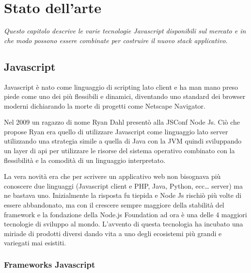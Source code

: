 \chapter{Stato dell'arte}
\label{cha:intro}
\vspace{5mm}
\emph{Questo capitolo descrive le varie tecnologie Javascript disponibili sul mercato e in che modo possono essere combinate per costruire il nuovo stack applicativo.}
\section{Javascript}\vspace{5mm}
Javascript è nato come linguaggio di scripting lato client e ha man mano preso piede come uno dei più flessibili e dinamici, diventando uno standard dei browser moderni dichiarando la morte di progetti come Netscape Navigator.\vspace{5mm}

Nel 2009 un ragazzo di nome Ryan Dahl presentò alla JSConf Node Js. Ciò che propose Ryan era quello di utilizzare Javascript come linguaggio lato server utilizzando una strategia simile a quella di Java con la JVM quindi sviluppando un layer di api per utilizzare le risorse del sistema operativo combinato con la flessibilità e la comodità di un linguaggio interpretato.\vspace{5mm}

La vera novità era che per scrivere un applicativo web non bisognava più conoscere due linguaggi (Javascript client e PHP, Java, Python, ecc… server) ma ne bastava uno. Inizialmente la risposta fu tiepida e Node Js rischiò più volte di essere abbandonato, ma con il crescere sempre maggiore della stabilità del framework e la fondazione della Node.js Foundation ad ora è una delle 4 maggiori tecnologie di sviluppo al mondo. L’avvento di questa tecnologia ha incubato una miriade di prodotti diversi dando vita a uno degli ecosistemi più grandi e variegati mai esistiti.\vspace{5mm}

\subsection{ Frameworks Javascript}\vspace{5mm}

